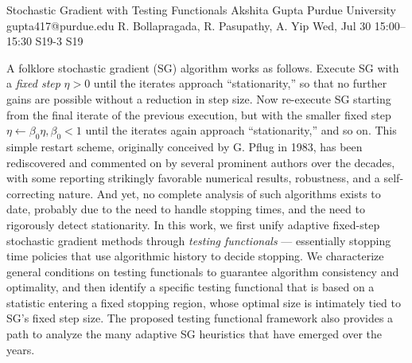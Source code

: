 \begin{talk}
  {Stochastic Gradient with Testing Functionals}%
  {Akshita Gupta}%
  {Purdue University}%
  {gupta417@purdue.edu}%
  {R. Bollapragada, R. Pasupathy, A. Yip}%
  {}%
  {Wed, Jul 30 15:00--15:30}%
  {S19-3}%
  {S19}%
  
    
   
A folklore stochastic gradient (SG) algorithm works as follows. Execute SG with a \emph{fixed step} $\eta >0$ until the iterates approach ``stationarity,'' so that no further gains are possible without a reduction in step size. Now re-execute SG starting from the final iterate of the previous execution, but with the smaller fixed step  $\eta \leftarrow \beta_0\eta, \beta_0 <1$ until the iterates again approach ``stationarity,'' and so on. This simple restart scheme, originally conceived by G. Pflug in 1983, has been rediscovered and commented on by several prominent authors over the decades, with some reporting strikingly favorable numerical results, robustness, and a self-correcting nature. And yet, no complete analysis of such algorithms exists to date, probably due to the need to handle stopping times, and the need to rigorously detect stationarity. In this work, we first unify adaptive fixed-step stochastic gradient methods through \emph{testing functionals} --- essentially stopping time policies that use algorithmic history to decide stopping. We characterize general conditions on testing functionals to guarantee algorithm consistency and optimality, and then identify a specific testing functional that is based on a statistic entering a fixed stopping region, whose optimal size is intimately tied to SG's fixed step size. The proposed testing functional framework also provides a path to analyze the many adaptive SG heuristics that have emerged over the years.

\medskip




\end{talk}

